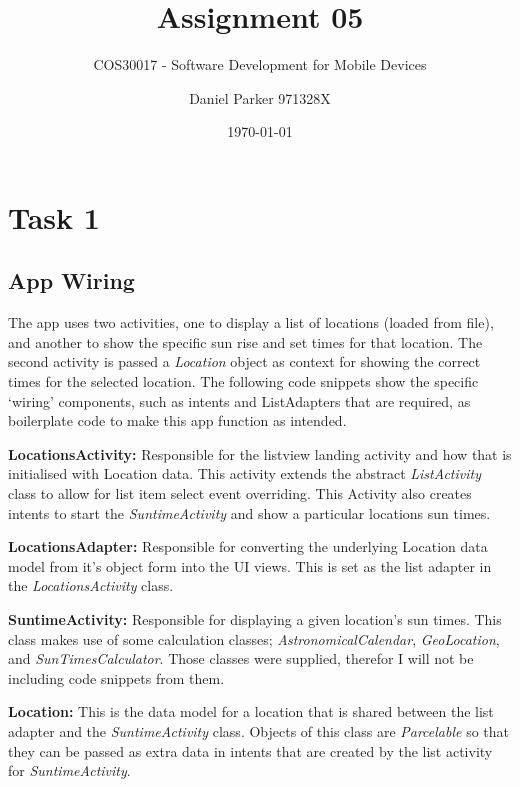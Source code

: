 \documentclass[11pt,english,numbers=endperiod,parskip=half]{scrartcl}
\title{Assignment 05}
\subtitle{COS30017 - Software Development for Mobile Devices}
\author{Daniel Parker 971328X}
\date{\today}
\begin{document}
\maketitle
\thispagestyle{empty}

\section{Task 1}
\subsection{App Wiring}
The app uses two activities, one to display a list of locations (loaded from file),
and another to show the specific sun rise and set times for that location. The
second activity is passed a \textit{Location} object as context for showing the
correct times for the selected location. The following code snippets show the
specific `wiring' components, such as intents and ListAdapters that are required,
as boilerplate code to make this app function as intended.

\textbf{LocationsActivity: }Responsible for the listview landing activity and
how that is initialised with Location data. This activity extends the abstract
\textit{ListActivity} class to allow for list item select event overriding. This
Activity also creates intents to start the \textit{SuntimeActivity} and show a
particular locations sun times.

\textbf{LocationsAdapter: }Responsible for converting the underlying Location
data model from it's object form into the UI views. This is set as the list
adapter in the \textit{LocationsActivity} class.

\textbf{SuntimeActivity: }Responsible for displaying a given location's sun times.
This class makes use of some calculation classes; \textit{AstronomicalCalendar},
\textit{GeoLocation}, and \textit{SunTimesCalculator}. Those classes were supplied,
therefor I will not be including code snippets from them.

\textbf{Location: }This is the data model for a location that is shared between
the list adapter and the \textit{SuntimeActivity} class. Objects of this class
are \textit{Parcelable} so that they can be passed as extra data in intents that
are created by the list activity for \textit{SuntimeActivity}.
\end{document}
